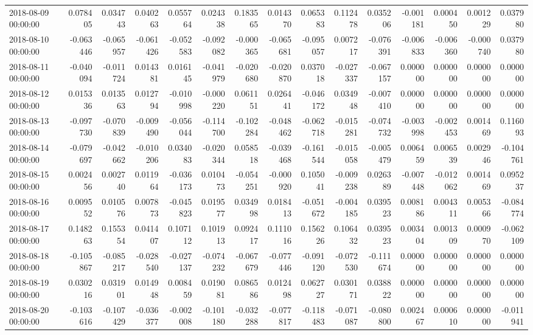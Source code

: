 \begin{tabular}{lrrrrrrrrrrrrrr}
2018-08-09 00:00:00 & 0.078405 & 0.034743 & 0.040263 & 0.055764 & 0.024338 & 0.183565 & 0.014370 & 0.065383 & 0.112478 & 0.035206 & -0.001181 & 0.000450 & 0.001229 & 0.037980 \\
2018-08-10 00:00:00 & -0.063446 & -0.065957 & -0.061426 & -0.052583 & -0.092082 & -0.000365 & -0.065681 & -0.095057 & 0.007217 & -0.076391 & -0.006833 & -0.006360 & -0.000740 & 0.037980 \\
2018-08-11 00:00:00 & -0.040094 & -0.011724 & 0.014381 & 0.016145 & -0.041979 & -0.020680 & -0.020870 & 0.037018 & -0.027337 & -0.067157 & 0.000000 & 0.000000 & 0.000000 & 0.000000 \\
2018-08-12 00:00:00 & 0.015336 & 0.013563 & 0.012794 & -0.010998 & -0.000220 & 0.061151 & 0.026441 & -0.046172 & 0.034948 & -0.007410 & 0.000000 & 0.000000 & 0.000000 & 0.000000 \\
2018-08-13 00:00:00 & -0.097730 & -0.070839 & -0.009490 & -0.056044 & -0.114700 & -0.102284 & -0.048462 & -0.062718 & -0.015281 & -0.074732 & -0.003998 & -0.002453 & 0.001469 & 0.116093 \\
2018-08-14 00:00:00 & -0.079697 & -0.042662 & -0.010206 & 0.034083 & -0.020344 & 0.058518 & -0.039468 & -0.161544 & -0.015058 & -0.005479 & 0.006459 & 0.006539 & 0.002946 & -0.104761 \\
2018-08-15 00:00:00 & 0.002456 & 0.002740 & 0.011964 & -0.036173 & 0.010473 & -0.054251 & -0.000920 & 0.105041 & -0.009238 & 0.026389 & -0.007448 & -0.012062 & 0.001469 & 0.095237 \\
2018-08-16 00:00:00 & 0.009552 & 0.010576 & 0.007873 & -0.045823 & 0.019577 & 0.034998 & 0.018413 & -0.051672 & -0.004185 & 0.039523 & 0.008186 & 0.004311 & 0.005366 & -0.084774 \\
2018-08-17 00:00:00 & 0.148263 & 0.155354 & 0.041407 & 0.107112 & 0.101913 & 0.092417 & 0.111016 & 0.156226 & 0.106432 & 0.039523 & 0.003404 & 0.001309 & 0.000970 & -0.062109 \\
2018-08-18 00:00:00 & -0.105867 & -0.085217 & -0.028540 & -0.027137 & -0.074232 & -0.067679 & -0.077446 & -0.091120 & -0.072530 & -0.111674 & 0.000000 & 0.000000 & 0.000000 & 0.000000 \\
2018-08-19 00:00:00 & 0.030216 & 0.031901 & 0.014948 & 0.008459 & 0.019081 & 0.086586 & 0.012498 & 0.062727 & 0.030171 & 0.038822 & 0.000000 & 0.000000 & 0.000000 & 0.000000 \\
2018-08-20 00:00:00 & -0.103616 & -0.107429 & -0.036377 & -0.002008 & -0.101180 & -0.032288 & -0.077817 & -0.118483 & -0.071087 & -0.080800 & 0.002467 & 0.000610 & 0.000000 & -0.011941 \\

\end{tabular}
